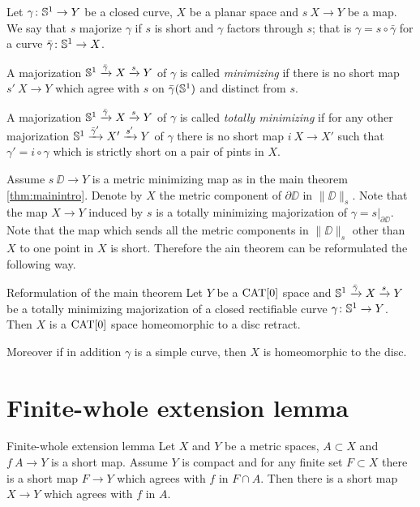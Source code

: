 \documentclass{article}
\begin{document}
Let 
$\gamma\colon\mathbb{S}^1\to Y$ be a closed curve,
$X$ be a planar space 
and $s\:X\to Y$ be a map.
We say that $s$ majorize $\gamma$ if $s$ is short and $\gamma$ factors through $s$;
that is $\gamma=s\circ\bar\gamma$ for a curve $\bar\gamma\colon\mathbb{S}^1\to X$.

A majorization $\mathbb{S}^1\xrightarrow{\bar\gamma}X\xrightarrow{s}Y$ of $\gamma$ is called \emph{minimizing} 
if there is no short map $s'\:X\to Y$ which agree with $s$ on $\bar\gamma(\mathbb{S}^1)$ and distinct from $s$.

A majorization $\mathbb{S}^1\xrightarrow{\bar\gamma}X\xrightarrow{s}Y$ of $\gamma$ is called \emph{totally minimizing}
if for any other majorization $\mathbb{S}^1\xrightarrow{\bar\gamma'}X'\xrightarrow{s'}Y$ of $\gamma$
there is no short map $i\:X\to X'$ such that $\gamma'=i\circ\gamma$ which is strictly short on a pair of pints in $X$. 

Assume $s\:\DD\to Y$ is a metric minimizing map as in the main theorem \ref{thm:mainintro}.
Denote by $X$ the metric component of $\partial \DD$ in $\|\DD\|_s$.
Note that the map $X\to Y$ induced by $s$ is a totally minimizing majorization of $\gamma=s|_{\partial \DD}$.
Note that the map  which sends all the metric components in $\|\DD\|_s$ other than $X$ to one point in $X$ is short.
Therefore the ain theorem can be reformulated the following way.

\begin{thm}{Reformulation of the main theorem}\label{thm:reformulation}
Let $Y$ be a $\mathop{\rm CAT}\nolimits[0]$ space and $\mathbb{S}^1\xrightarrow{\bar\gamma}X\xrightarrow{s}Y$ be a totally minimizing majorization of a closed rectifiable curve $\gamma\colon\mathbb{S}^1\to Y$.
Then $X$ is a $\mathop{\rm CAT}\nolimits[0]$ space homeomorphic to a disc retract.

Moreover if in addition $\gamma$ is a simple curve, then $X$ is homeomorphic to the disc.
\end{thm}

\section{Finite-whole extension lemma}\label{Finite-whole extension lemma}

\begin{thm}{Finite-whole extension lemma}\label{lem:finite-whole}
Let $X$ and $Y$ be a metric spaces, $A\subset X$ and $f\:A\to Y$ is a short map.
Assume $Y$ is compact and for any finite set $F\subset X$ there is a short map $F\to Y$ which agrees with $f$ in $F\cap A$.
Then there is a short map $X\to Y$ which agrees with $f$ in $A$.
\end{thm}
\end{document}
